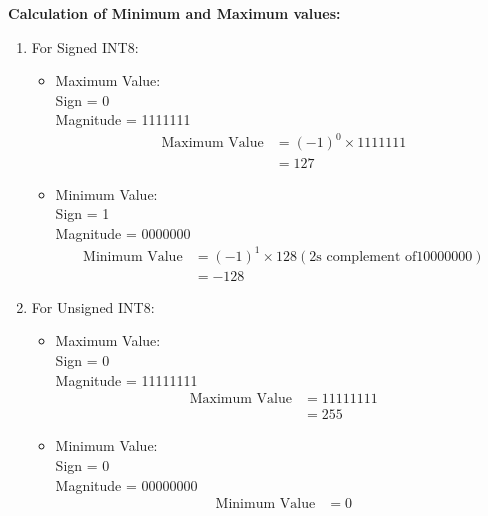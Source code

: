 \begin{enumerate}[label=\textbf{\roman*.}]
    \textbf{Calculation of Minimum and Maximum values:} 
    \begin{enumerate}
        \item For Signed INT8:
        \begin{itemize}
            \item Maximum Value:\\
            Sign = 0 \\
            Magnitude = 1111111
                \[
                \begin{aligned}
                    \text{Maximum Value} &= (-1)^{0} \times 1111111 \\
                    &= 127
                \end{aligned}
                \]
            \item Minimum Value:\\
            Sign = 1 \\
            Magnitude = 0000000 
                \[
                \begin{aligned}
                    \text{Minimum Value} &= (-1)^{1} \times 128 (\text{2s complement of} 10000000)\\
                    &= -128
                \end{aligned}
                \]
            \end{itemize}
    \item For Unsigned INT8: 
            \begin{itemize}
                \item Maximum Value:\\
            Sign = 0 \\
            Magnitude = 11111111
                \[
                \begin{aligned}
                    \text{Maximum Value} &= 11111111 \\
                    &=255
                \end{aligned}
                \]
            \item Minimum Value:\\
            Sign = 0 \\
            Magnitude = 00000000 
                \[
                \begin{aligned}
                    \text{Minimum Value} &= 0
                \end{aligned}
            \]
            \end{itemize}
    \end{enumerate}


\end{enumerate}
